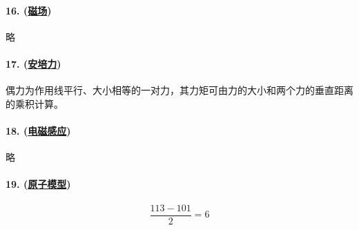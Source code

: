 \paragraph{16. (\hyperref[subsec:磁场]{磁场})} 略
\paragraph{17. (\hyperref[subsec:安培力]{安培力})} 偶力为作用线平行、大小相等的一对力，其力矩可由力的大小和两个力的垂直距离的乘积计算。
\paragraph{18. (\hyperref[subsec:电磁感应]{电磁感应})} 略
\paragraph{19. (\hyperref[sec:原子模型]{原子模型})}

\begin{equation*}
    \frac{113-101}{2}=6
\end{equation*}
